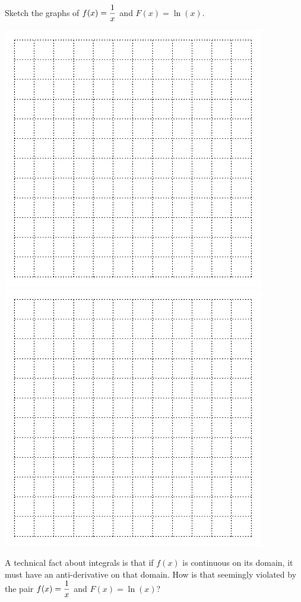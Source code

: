 \begin{problem}
Sketch the graphs of $\displaystyle f(x) = \frac{1}{x}$ and $F(x) = \ln(x)$.

\end{problem}
\includegraphics[width=4.5in]{graphics/empty_graph_square_12}
\includegraphics[width=4.5in]{graphics/empty_graph_square_12}

\newpage
 A technical fact about integrals is that if $f(x)$ is continuous on its
  domain, it must have an anti-derivative on that domain.  How is that
  seemingly violated by the pair $\displaystyle f(x) = \frac{1}{x}$ and $F(x) = \ln(x)$?


